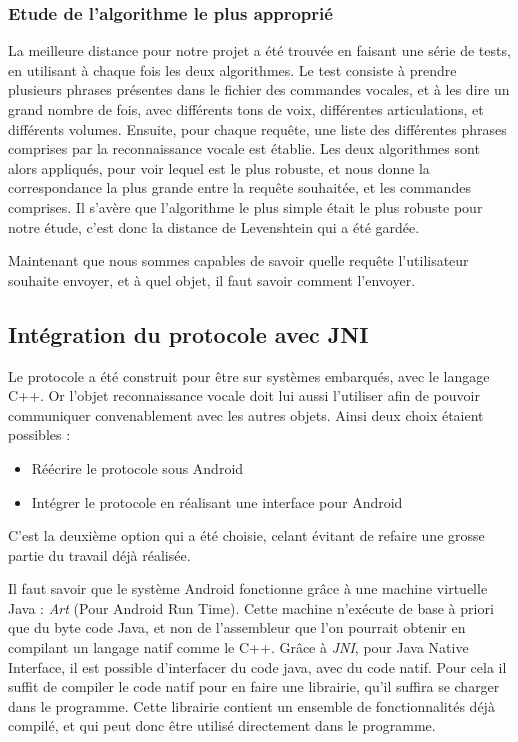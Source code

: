\subsubsection{Etude de l'algorithme le plus approprié}
La meilleure distance pour notre projet a été trouvée en faisant une série de tests, en utilisant à chaque 
fois les deux algorithmes. Le test consiste à prendre plusieurs phrases présentes dans le fichier des 
commandes vocales, et à les dire un grand nombre de fois, avec différents tons de voix, différentes 
articulations, et différents volumes. Ensuite, pour chaque requête, une liste des différentes phrases 
comprises par la reconnaissance vocale est établie. Les deux algorithmes sont alors appliqués, pour voir 
lequel est le plus robuste, et nous donne la correspondance la plus grande entre la requête souhaitée, et les 
commandes comprises. Il s'avère que l'algorithme le plus simple  était le plus robuste pour notre étude, 
c'est donc la distance de Levenshtein qui a été gardée. 

Maintenant que nous sommes capables de savoir quelle requête l'utilisateur souhaite envoyer, et à quel objet, 
il faut savoir comment l'envoyer.

	\subsection{Intégration du protocole avec JNI}
Le protocole a été construit pour être sur systèmes embarqués, avec le langage C++. Or l'objet reconnaissance 
vocale doit lui aussi l'utiliser afin de pouvoir communiquer convenablement avec les autres objets. Ainsi deux 
choix étaient possibles :
\begin{itemize}
 \item Réécrire le protocole sous Android
 \item Intégrer le protocole en réalisant une interface pour Android
\end{itemize}

C'est la deuxième option qui a été choisie, celant évitant de refaire une grosse partie du travail déjà 
réalisée.

Il faut savoir que le système Android fonctionne grâce à une machine virtuelle Java : \emph{Art} (Pour 
Android Run Time). Cette machine n'exécute de base à priori que du byte code Java, et non de l'assembleur que 
l'on pourrait obtenir en compilant un langage natif comme le C++. Grâce à \emph{JNI}, pour Java Native 
Interface, il est possible d'interfacer du code java, avec du code natif. Pour cela il suffit de compiler le 
code natif pour en faire une librairie, qu'il suffira se charger dans le programme. Cette librairie 
contient un ensemble de fonctionnalités déjà compilé, et qui peut donc être utilisé directement dans le 
programme.

